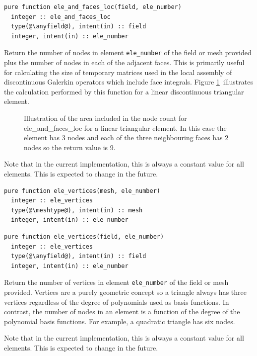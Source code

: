 \documentclass[a4paper, 11pt]{book}
\newcommand{\ifhtlatex}[2]{\ifthenelse{\boolean{HTLatex}}{#1}{#2}}
\newcommand{\xfig}[1]{
  \ifhtlatex{
    \texttt{[image: \#1.png]}
  }{
    
  }
}
\begin{document}
\begin{lstlisting}
pure function ele_and_faces_loc(field, ele_number)
  integer :: ele_and_faces_loc
  type(@\anyfield@), intent(in) :: field
  integer, intent(in) :: ele_number
\end{lstlisting}

Return the number of nodes in element \lstinline+ele_number+ of the field
or mesh provided plus the number of nodes in each of the adjacent
faces. This is primarily useful for calculating the size of temporary
matrices used in the local assembly of discontinuous Galerkin operators
which include face integrals. Figure \ref{fig:elefacesloc}\ illustrates the
calculation performed by this function for a linear discontinuous triangular
element.

\begin{figure}[ht]
  \centering
  \xfig{cq_stencil}
  \caption{Illustration of the area included in the node count for
    ele\_and\_faces\_loc for a linear triangular element. In this case the
    element has 3 nodes and each of the three neighbouring faces has 2 nodes
    so the return value is 9.}
  \label{fig:elefacesloc}
\end{figure}
Note that in the current implementation, this is always a
constant value for all elements. This is expected to change in the future.


\begin{lstlisting}
pure function ele_vertices(mesh, ele_number)
  integer :: ele_vertices
  type(@\meshtype@), intent(in) :: mesh
  integer, intent(in) :: ele_number
\end{lstlisting}

\begin{lstlisting}
pure function ele_vertices(field, ele_number)
  integer :: ele_vertices
  type(@\anyfield@), intent(in) :: field
  integer, intent(in) :: ele_number
\end{lstlisting}

Return the number of vertices in element \lstinline+ele_number+ of the field
or mesh provided. Vertices are a purely geometric concept so a triangle
always has three vertices regardless of the degree of polynomials used as 
basis functions. In contrast, the number of nodes in an element is a
function of the degree of the polynomial basis functions. For example, a
quadratic triangle has six nodes.

Note that in the current implementation, this is always a
constant value for all elements. This is expected to change in the future.
\end{document}
